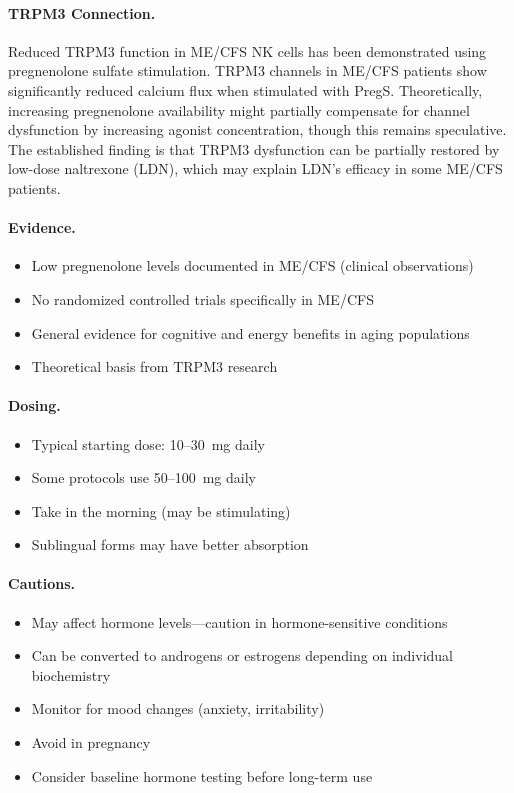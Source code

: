 \paragraph{TRPM3 Connection.}
Reduced TRPM3 function in ME/CFS NK cells has been demonstrated using pregnenolone sulfate stimulation. TRPM3 channels in ME/CFS patients show significantly reduced calcium flux when stimulated with PregS. Theoretically, increasing pregnenolone availability might partially compensate for channel dysfunction by increasing agonist concentration, though this remains speculative. The established finding is that TRPM3 dysfunction can be partially restored by low-dose naltrexone (LDN), which may explain LDN's efficacy in some ME/CFS patients.

\paragraph{Evidence.}
\begin{itemize}
    \item Low pregnenolone levels documented in ME/CFS (clinical observations)
    \item No randomized controlled trials specifically in ME/CFS
    \item General evidence for cognitive and energy benefits in aging populations
    \item Theoretical basis from TRPM3 research
\end{itemize}

\paragraph{Dosing.}
\begin{itemize}
    \item Typical starting dose: 10--30~mg daily
    \item Some protocols use 50--100~mg daily
    \item Take in the morning (may be stimulating)
    \item Sublingual forms may have better absorption
\end{itemize}

\paragraph{Cautions.}
\begin{itemize}
    \item May affect hormone levels---caution in hormone-sensitive conditions
    \item Can be converted to androgens or estrogens depending on individual biochemistry
    \item Monitor for mood changes (anxiety, irritability)
    \item Avoid in pregnancy
    \item Consider baseline hormone testing before long-term use
\end{itemize}


